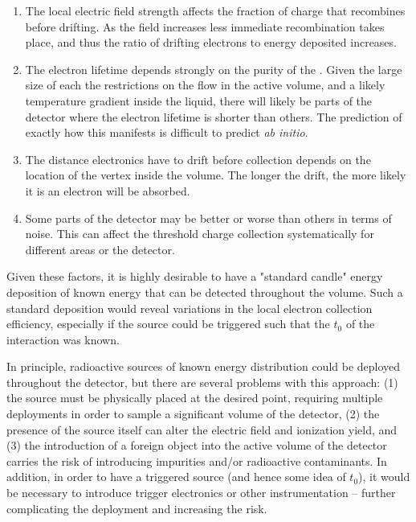 \begin{enumerate}
\item The local electric field strength affects the fraction of charge that recombines before drifting. As the field increases %
less immediate recombination takes place, and thus the ratio of drifting electrons to energy deposited increases.
\item The electron lifetime depends strongly on the purity of the . Given the large size of %
each  the restrictions on the flow in the active volume, and a likely temperature gradient inside the liquid, %
there will likely be parts of the detector where the electron lifetime is shorter than others. The prediction of exactly how this manifests is difficult to predict {\it ab initio}.
\item The distance electronics have to drift%
before collection depends on the location of the vertex inside the volume. The longer the drift, the more likely it is an electron will be absorbed.
\item Some parts of the detector %
may be better or worse than others in terms of noise. This can affect the threshold charge collection systematically for different areas or the detector.
\end{enumerate}

Given these factors, it is highly desirable to %
have a "standard candle" energy deposition of known energy that can be detected throughout the volume. Such a standard deposition would reveal variations in the local electron collection efficiency, especially if the source could be triggered such that the $t_0$ of the interaction was known.

In principle, radioactive sources of known energy distribution could be deployed throughout the detector, but there are several problems with this approach: (1)  the source must be physically placed at the desired point, %
requiring multiple deployments in order to sample a significant volume of the detector, (2) the presence of the source itself can alter the electric field and ionization yield, and (3) the introduction of a foreign object into the active volume of the detector carries the risk of introducing impurities and/or radioactive contaminants. In addition, in order to have a triggered source (and hence some idea of $t_0$), %
it would be necessary to introduce trigger electronics or other instrumentation -- further complicating the deployment and increasing the risk.

